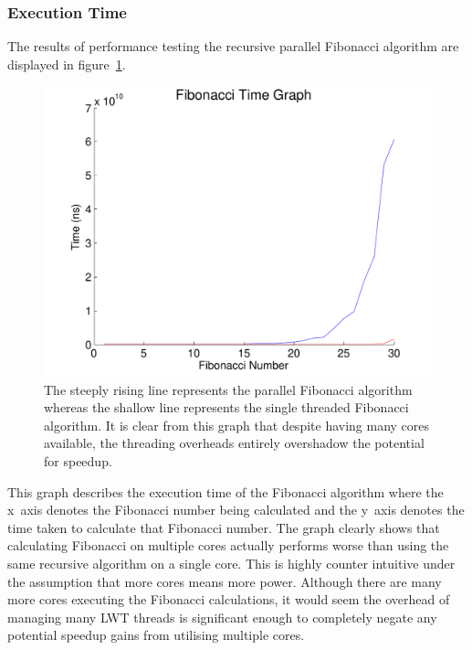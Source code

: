 \documentclass[12pt,twoside,notitlepage]{report}
\begin{document}
\subsubsection{Execution Time}
The results of performance testing the recursive parallel Fibonacci algorithm are displayed in figure~\ref{fig:fib_time_graph}.
\begin{figure}[h!]
\includegraphics[width=\linewidth]{fib_time_graph}
\caption[Fibonacci Execution Time Graph]{The steeply rising line represents the parallel Fibonacci algorithm whereas the shallow line represents the single threaded Fibonacci algorithm. It is clear from this graph that despite having many cores available, the
threading overheads entirely overshadow the potential for speedup.}
\label{fig:fib_time_graph}
\end{figure}
This graph describes the execution time of the Fibonacci algorithm where the x~axis denotes the Fibonacci number being calculated and the y~axis denotes the time taken to calculate that Fibonacci number. The graph clearly shows that
calculating Fibonacci on multiple cores actually performs worse than using the same recursive algorithm on a single core. This is highly counter intuitive under the assumption that more cores means more power. Although there are many
more cores executing the Fibonacci calculations, it would seem the overhead of managing many LWT threads is significant enough to completely negate any potential speedup gains from utilising multiple cores.
\hfill\\
\hfill\\
%
\end{document}
